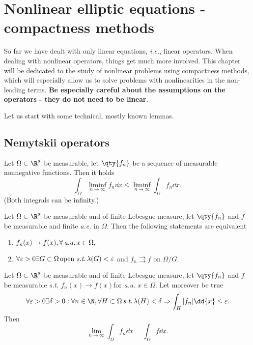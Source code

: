 
\section{Nonlinear elliptic equations - compactness methods}
\label{sec:nonlinear_elliptic_compact}

So far we have dealt with only linear equations, \textit{i.e.}, linear operators. When dealing with nonlinear operators, things get much more involved. This chapter will be dedicated to the study of nonlinear problems using compactness methods, which will especially allow us to solve problems with nonlinearities in the non-leading terms. \textbf{Be especially careful about the assumptions on the operators - they do not need to be linear.}

Let us start with some technical, mostly known lemmas.

\subsection{Nemytskii operators}
\label{sec:nemytskii_operators}

\begin{lemma}[Fatou]
	Let $\Omega \subset \R^{d}$ be measurable, let $\qty{f_n}$ be a sequence of measurable nonnegative functions. Then it holds
	\[
		\int_{\Omega}\liminf_{n\to \infty}f_n\dd{x} \leq \liminf_{n \to \infty}\int_{\Omega}f_n\dd{x}.
	\]
	(Both integrals can be infinity.)
    
\end{lemma}

\begin{theorem}[Iegorov]
	Let $\Omega \subset \R^{d}$ be measurable and of finite Lebesgue measure, let $\qty{f_n}$ and $f$ be measurable and finite \textit{a.e.} in $\Omega$. Then the following statements are equivalent
\begin{enumerate}
	\item $f_n(x) \to f(x), \forall \, \text{\textit{a.a.}} \,x \in \Omega,$
	\item $\forall \varepsilon >0 \exists G \subset \Omega \, \text{open} \, \, \text{\textit{s.t.}} \, \lambda(G) < \varepsilon$ and $f_n \rightrightarrows f$ on $\Omega / G.$
\end{enumerate}
\end{theorem}

\begin{theorem}[Vitali]
    Let $\Omega \subset \R^{d}$ be measurable and of finite Lebesgue measure, let $\qty{f_n}$ and $f$ be measurable \textit{s.t.} $f_n(x) \to f(x)$for \textit{a.a.} $x \in \Omega$. Let moreover be true
    \[
	    \forall \varepsilon > 0 \exists \delta >0: \forall n \in \N, \forall H \subset \Omega \, \text{\textit{s.t.}} \, \lambda(H) < \delta \Rightarrow \int_{H}|f_n|\dd{x} \leq \varepsilon.
    \]
    Then
    \[
	    \lim_{n\to \infty} \int_{\Omega}f_n\dd{x} = \int_{\Omega}f\dd{x}.
    \]
\end{theorem}


